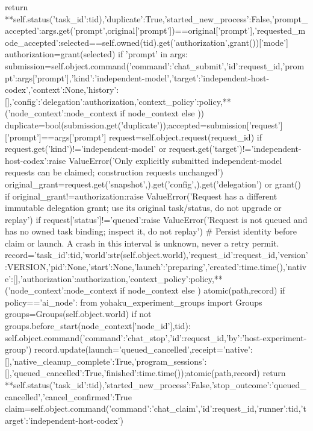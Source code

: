                 return {**self.status({'task_id':tid}),'duplicate':True,'started_new_process':False,'prompt_accepted':args.get('prompt',original['prompt'])==original['prompt'],'requested_mode_accepted':selected==self.owned(tid).get('authorization',grant())['mode']}
            authorization=grant(selected)
            if 'prompt' in args:
                submission=self.object.command({'command':'chat_submit','id':request_id,'prompt':args['prompt'],'kind':'independent-model','target':'independent-host-codex','context':None,'history':[],'config':{'delegation':authorization,'context_policy':policy,**({'node_context':node_context} if node_context else {})}})
                duplicate=bool(submission.get('duplicate'));accepted=submission['request']['prompt']==args['prompt']
            request=self.object.request(request_id)
            if request.get('kind')!='independent-model' or request.get('target')!='independent-host-codex':raise ValueError('Only explicitly submitted independent-model requests can be claimed; construction requests unchanged')
            original_grant=request.get('snapshot',{}).get('config',{}).get('delegation') or grant()
            if original_grant!=authorization:raise ValueError('Request has a different immutable delegation grant; use its original task/status, do not upgrade or replay')
            if request['status']!='queued':raise ValueError('Request is not queued and has no owned task binding; inspect it, do not replay')
            # Persist identity before claim or launch. A crash in this interval is unknown, never a retry permit.
            record={'task_id':tid,'world':str(self.object.world),'request_id':request_id,'version':VERSION,'pid':None,'start':None,'launch':'preparing','created':time.time(),'native':[],'authorization':authorization,'context_policy':policy,**({'node_context':node_context} if node_context else {})}
            atomic(path,record)
            if policy=='ai_node':
                from yohaku_experiment_groups import Groups
                groups=Groups(self.object.world)
                if not groups.before_start(node_context['node_id'],tid):
                    self.object.command({'command':'chat_stop','id':request_id,'by':'host-experiment-group'})
                    record.update(launch='queued_cancelled',receipt={'native':[],'native_cleanup_complete':True,'program_sessions':[],'queued_cancelled':True,'finished':time.time()});atomic(path,record)
                    return {**self.status({'task_id':tid}),'started_new_process':False,'stop_outcome':'queued_cancelled','cancel_confirmed':True}
            claim=self.object.command({'command':'chat_claim','id':request_id,'runner':tid,'target':'independent-host-codex'})
